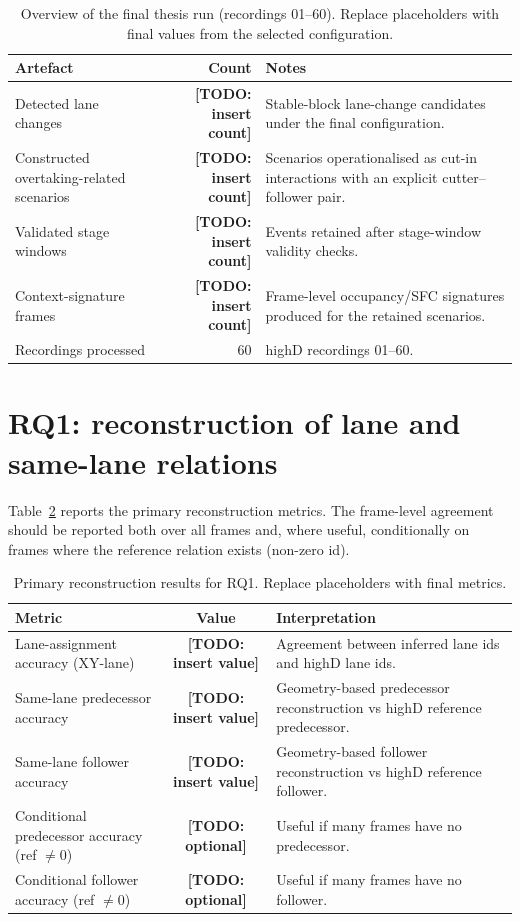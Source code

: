 \documentclass[12pt,a4paper,twoside,openright]{report}
\newcommand{\TODO}[1]{\textbf{[TODO: #1]}}
\begin{document}
    \begin{table}[H]
        \centering
        \caption{Overview of the final thesis run (recordings 01--60). Replace placeholders with final values from the selected configuration.}
        \label{tab:results-overview}
        {\small
        \setlength{\tabcolsep}{4pt}
            \begin{tabularx}{\textwidth}{@{}XrX@{}}
\toprule
Artefact & Count & Notes \\
\midrule
Detected lane changes & \TODO{insert count} & Stable-block lane-change candidates under the final configuration. \\
Constructed overtaking-related scenarios & \TODO{insert count} & Scenarios operationalised as cut-in interactions with an explicit cutter--follower pair. \\
Validated stage windows & \TODO{insert count} & Events retained after stage-window validity checks. \\
Context-signature frames & \TODO{insert count} & Frame-level occupancy/SFC signatures produced for the retained scenarios. \\
Recordings processed & 60 & highD recordings 01--60. \\
\bottomrule
            \end{tabularx}}
    \end{table}

    \section{RQ1: reconstruction of lane and same-lane relations}
    Table~\ref{tab:rq1-metrics} reports the primary reconstruction metrics. The frame-level agreement should be reported both over all frames and, where useful, conditionally on frames where the reference relation exists (non-zero id).

    \begin{table}[H]
        \centering
        \caption{Primary reconstruction results for RQ1. Replace placeholders with final metrics.}
        \label{tab:rq1-metrics}
        {\small
        \setlength{\tabcolsep}{4pt}
            \begin{tabularx}{\textwidth}{@{}l c X@{}}
\toprule
Metric & Value & Interpretation \\
\midrule
Lane-assignment accuracy (XY-lane) & \TODO{insert value} & Agreement between inferred lane ids and highD lane ids. \\
Same-lane predecessor accuracy & \TODO{insert value} & Geometry-based predecessor reconstruction vs highD reference predecessor. \\
Same-lane follower accuracy & \TODO{insert value} & Geometry-based follower reconstruction vs highD reference follower. \\
Conditional predecessor accuracy (ref $\neq 0$) & \TODO{optional} & Useful if many frames have no predecessor. \\
Conditional follower accuracy (ref $\neq 0$) & \TODO{optional} & Useful if many frames have no follower. \\
\bottomrule
            \end{tabularx}}
    \end{table}
\end{document}
